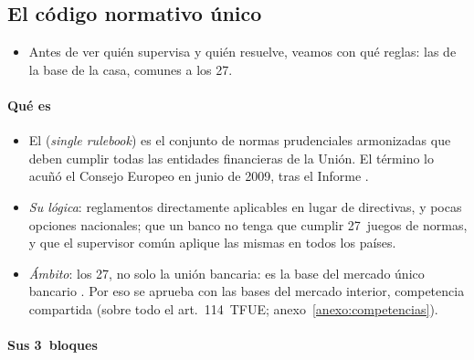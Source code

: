 \documentclass[11pt]{article}
\begin{document}
\subsection{El código normativo único}\label{sec:codigo}

\begin{itemize}
\item Antes de ver quién supervisa y quién resuelve, veamos con qué reglas: las de la base de la casa, comunes a los 27.
\end{itemize}

\paragraph{Qué es}

\begin{itemize}
\item El  (\emph{single rulebook}) es el conjunto de normas prudenciales armonizadas que deben cumplir todas las entidades financieras de la Unión. El término lo acuñó el Consejo Europeo en junio de 2009, tras el Informe .
\item \emph{Su lógica}: reglamentos directamente aplicables en lugar de directivas, y pocas opciones nacionales; que un banco no tenga que cumplir 27~juegos de normas, y que el supervisor común aplique las mismas en todos los países.
\item \emph{Ámbito}: los 27, no solo la unión bancaria: es la base del mercado único bancario . Por eso se aprueba con las bases del mercado interior, competencia compartida (sobre todo el art.~114~TFUE; anexo~\ref{anexo:competencias}).
\end{itemize}

\paragraph{Sus 3~bloques}
\end{document}
